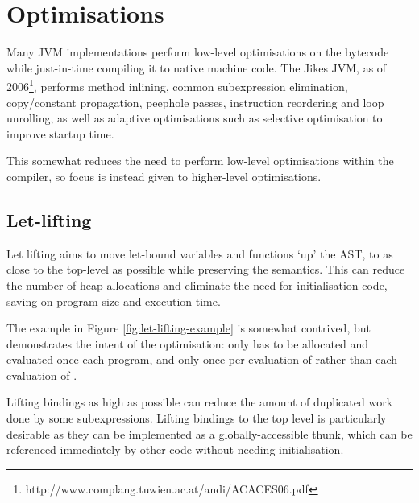 \documentclass[dissertation.tex]{subfiles}
\begin{document}
\section{Optimisations}
{
    Many JVM implementations perform low-level optimisations on the bytecode while just-in-time compiling it to native machine code. The Jikes JVM, as of 2006\footnote{http://www.complang.tuwien.ac.at/andi/ACACES06.pdf}, performs method inlining, common subexpression elimination, copy/constant propagation, peephole passes, instruction reordering and loop unrolling, as well as adaptive optimisations such as selective optimisation to improve startup time.

    This somewhat reduces the need to perform low-level optimisations within the compiler, so focus is instead given to higher-level optimisations.

    \subsection{Let-lifting}
    {
        Let lifting aims to move let-bound variables and functions `up' the AST, to as close to the top-level as possible while preserving the semantics. This can reduce the number of heap allocations and eliminate the need for initialisation code, saving on program size and execution time.

        The example in Figure \ref{fig:let-lifting-example} is somewhat contrived, but demonstrates the intent of the optimisation:  only has to be allocated and evaluated once each program, and  only once per evaluation of  rather than each evaluation of .

        Lifting bindings as high as possible can reduce the amount of duplicated work done by some subexpressions. Lifting bindings to the top level is particularly desirable as they can be implemented as a globally-accessible thunk, which can be referenced immediately by other code without needing initialisation.

}}
\end{document}
